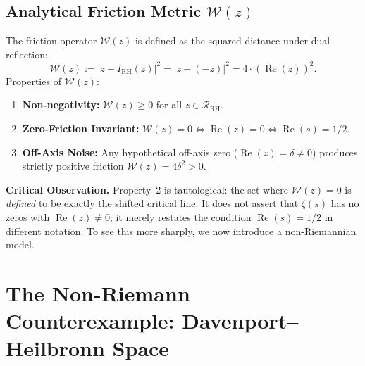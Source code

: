 \documentclass[11pt,a4paper]{article}
\numberwithin{table}{section}
\begin{document}
\subsection{Analytical Friction Metric \texorpdfstring{$\mathcal{W}(z)$}{W(z)}}
The friction operator $\mathcal{W}(z)$ is defined as the squared distance under
dual reflection:
\begin{equation}
\mathcal{W}(z) := \left| z - I_{\text{RH}}(z) \right|^2 = |z - (-z)|^2 = 4 \cdot (\operatorname{Re}(z))^2 .
\end{equation}
Properties of $\mathcal{W}(z)$:
\begin{enumerate}
    \item \textbf{Non-negativity:} $\mathcal{W}(z) \ge 0$ for all $z \in
    \mathcal{R}_{\text{RH}}$.
    \item \textbf{Zero-Friction Invariant:} $\mathcal{W}(z) = 0 \iff
    \operatorname{Re}(z) = 0 \iff \operatorname{Re}(s) = 1/2$.
    \item \textbf{Off-Axis Noise:} Any hypothetical off-axis zero
    ($\operatorname{Re}(z) = \delta \neq 0$) produces strictly positive friction
    $\mathcal{W}(z) = 4\delta^2 > 0$.
\end{enumerate}

\noindent\textbf{Critical Observation.} Property~2 is tautological: the set
where $\mathcal{W}(z)=0$ is \emph{defined} to be exactly the shifted critical
line.
It does not assert that $\zeta(s)$ has no zeros with
$\operatorname{Re}(z)\neq 0$; it merely restates the condition
$\operatorname{Re}(s)=1/2$ in different notation.
To see this more sharply, we now introduce a non-Riemannian model.

\section{The Non-Riemann Counterexample: Davenport--Heilbronn Space}
\end{document}
